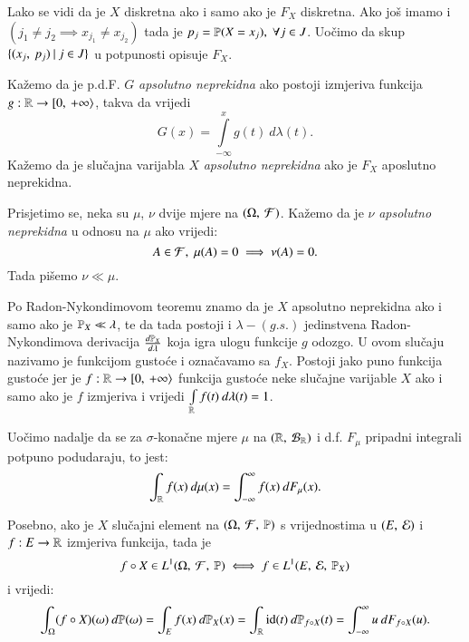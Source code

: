 Lako se vidi da je $X$ diskretna ako i samo ako je $F_X$ diskretna.
Ako jo\v s imamo i $(j_1 \neq j_2 \implies x_{j_1} \neq x_{j_2})$ tada je $p_j = \mathbb{P}({X = x_j}), \; \forall j \in J$.
Uo\v cimo da skup $\{{({x_j}, \: {p_j})} \: | \: {j \in J}\}$ u potpunosti opisuje $F_X$.

\begin{defn}    \label{defn:5.11-2}
Ka\v zemo da je p.d.F. $G$ \emph{apsolutno neprekidna} ako postoji izmjeriva funkcija $g : \mathbb{R} \to [ {0}, \: {+\infty} \rangle$, takva da vrijedi
\begin{equation*}
    G(x) = \int\limits_{-\infty}^{x} g(t) \: d \lambda (t).
\end{equation*}
Ka\v zemo da je slu\v cajna varijabla $X$ \emph{apsolutno neprekidna} ako je $F_X$ aposlutno neprekidna.
\end{defn}

\begin{nap} \label{nap:5.11-3}
    Prisjetimo se, neka su $\mu$, $\nu$ dvije mjere na $(\Omega, \: \mathcal{F})$. Ka\v zemo da je $\nu$ \emph{apsolutno neprekidna} u odnosu na $\mu$ ako vrijedi:
    \begin{equation*}
        A \in \mathcal{F}, \; \mu(A) = 0 \implies \nu (A) = 0.
    \end{equation*}
    Tada pi\v semo $\nu \ll \mu$.
\end{nap}

Po Radon-Nykondimovom teoremu znamo da je $X$ apsolutno neprekidna ako i samo ako je $\mathbb{P}_X \ll \lambda$, te da tada postoji i $\lambda-(g.s.)$ jedinstvena Radon-Nykondimova derivacija $\frac{d \mathbb{P}_X}{d \lambda}$ koja igra ulogu funkcije $g$ odozgo.
U ovom slu\v caju nazivamo je funkcijom gusto\' ce i ozna\v cavamo sa $f_X$.
Postoji jako puno funkcija gusto\' ce jer je $f: \mathbb{R} \to [ {0}, \: {+\infty} \rangle$ funkcija gusto\' ce neke slu\v cajne varijable $X$ ako i samo ako je $f$ izmjeriva i vrijedi $\int\limits_{\mathbb{R}} f(t) \: d \lambda (t) = 1$.

Uo\v cimo nadalje da se za $\sigma$-kona\v cne mjere $\mu$ na $({\mathbb{R}}, \: {\mathcal{B}_{\mathbb{R}}})$ i d.f. $F_{\mu}$ pripadni integrali potpuno podudaraju, to jest:
\begin{equation*}
    \int_{\mathbb{R}} f(x) \: d \mu (x) = \int_{-\infty}^{\infty} f(x) \: d F_{\mu} (x).
\end{equation*}

Posebno, ako je $X$ slu\v cajni element na $(\Omega, \: \mathcal{F}, \: \mathbb{P})$ s vrijednostima u $({E}, \: {\mathcal{E}})$ i $f:E \to \mathbb{R}$ izmjeriva funkcija, tada je
\begin{equation*}
    f \circ X \in L^1 (\Omega, \: \mathcal{F}, \: \mathbb{P}) \iff f \in L^1 (E, \: \mathcal{E}, \: \mathbb{P}_X)
\end{equation*}
i vrijedi:
\begin{equation*}
    \int_{\Omega} (f \circ X) (\omega) \: d \mathbb{P} (\omega)
    = \int_E f(x) \: d \mathbb{P}_X (x)
    = \int_{\mathbb{R}} \mathrm{id} (t) \: d \mathbb{P}_{f \circ X} (t)
    = \int_{-\infty}^{\infty} u \: d F_{f \circ X} (u).
\end{equation*}

